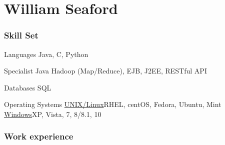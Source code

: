 \documentclass{tccv}
\begin{document}
\part{William Seaford}

\section{Skill Set}

\begin{factlist}

\item{Languages}
     {Java, C, Python}
     
\item{Specialist Java}
	 {Hadoop (Map/Reduce), EJB, J2EE, RESTful API}
	 
\item{Databases}
	 {SQL}

\item{Operating Systems}
	{\underline{UNIX/Linux}\newline RHEL, centOS, Fedora, Ubuntu, Mint  \newline \underline{Windows}\newline XP, Vista, 7, 8/8.1, 10}
\end{factlist}

\section{Work experience}
\end{document}

